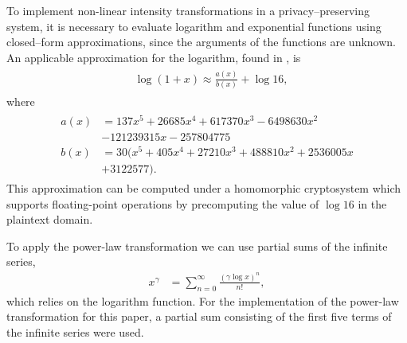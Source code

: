 To implement non-linear intensity transformations in a privacy--preserving system, it is necessary to evaluate logarithm and exponential functions using closed--form approximations, since the arguments of the functions are unknown. An applicable approximation for the logarithm, found in \cite{pcsc-paper}, is
\begin{align}\label{eq:optimal_log_approximation}
	\begin{split}
		&\log\left(1+x\right) \approx \frac{a(x)}{b(x)} + \log{16} ,
	\end{split}
\end{align}
where
\begin{align*}
	\begin{split}
	a(x) &= 137x^5 + 26685x^4 + 617370x^3 - 6498630x^2 \\
	&- 121239315x - 257804775\\
	b(x) &= 30(x^5 + 405x^4 + 27210x^3 + 488810x^2 + 2536005x \\
	&+ 3122577).
	\end{split}
\end{align*}
This approximation can be computed under a homomorphic cryptosystem which supports floating-point operations by precomputing the value of $\log{16}$ in the plaintext domain.

To apply the power-law transformation we can use partial sums of the infinite series,
\begin{align} \label{eq:power_approximation}
	x^\gamma &= \sum_{n=0}^{\infty}{\frac{(\gamma\log{x})^n}{n!}},
\end{align}
which relies on the logarithm function.
For the implementation of the power-law transformation for this paper, a partial sum consisting of the first five terms of the infinite series were used.
